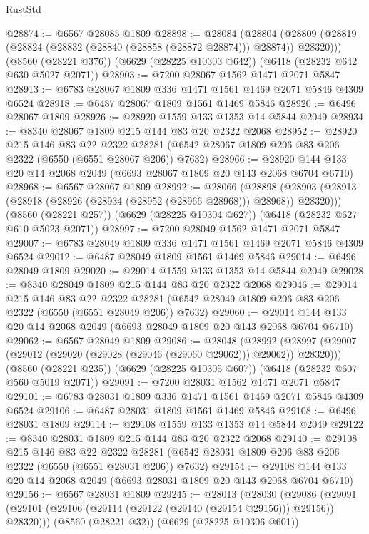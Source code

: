 \begin{lexlean}{RustStd}
\begin{coremodule}
@28874 := @6567 @28085 @1809
@28898 := @28084
    (@28804 (@28809 (@28819 (@28824 (@28832 (@28840 (@28858 (@28872 @28874))) @28874)) @28320)))
    (@8560 (@28221 @376))
    (@6629 (@28225 @10303 @642))
    (@6418 (@28232 @642 @630 @5027 @2071))
@28903 := @7200 @28067 @1562 @1471 @2071 @5847
@28913 := @6783 @28067 @1809 @336 @1471 @1561 @1469 @2071 @5846 @4309 @6524
@28918 := @6487 @28067 @1809 @1561 @1469 @5846
@28920 := @6496 @28067 @1809
@28926 := @28920 @1559 @133 @1353 @14 @5844 @2049
@28934 := @8340 @28067 @1809 @215 @144 @83 @20 @2322 @2068
@28952 := @28920
    @215
    @146
    @83
    @22
    @2322
    @28281
    (@6542 @28067 @1809 @206 @83 @206 @2322 (@6550 (@6551 @28067 @206)) @7632)
@28966 := @28920 @144 @133 @20 @14 @2068 @2049 (@6693 @28067 @1809 @20 @143 @2068 @6704 @6710)
@28968 := @6567 @28067 @1809
@28992 := @28066
    (@28898 (@28903 (@28913 (@28918 (@28926 (@28934 (@28952 (@28966 @28968))) @28968)) @28320)))
    (@8560 (@28221 @257))
    (@6629 (@28225 @10304 @627))
    (@6418 (@28232 @627 @610 @5023 @2071))
@28997 := @7200 @28049 @1562 @1471 @2071 @5847
@29007 := @6783 @28049 @1809 @336 @1471 @1561 @1469 @2071 @5846 @4309 @6524
@29012 := @6487 @28049 @1809 @1561 @1469 @5846
@29014 := @6496 @28049 @1809
@29020 := @29014 @1559 @133 @1353 @14 @5844 @2049
@29028 := @8340 @28049 @1809 @215 @144 @83 @20 @2322 @2068
@29046 := @29014
    @215
    @146
    @83
    @22
    @2322
    @28281
    (@6542 @28049 @1809 @206 @83 @206 @2322 (@6550 (@6551 @28049 @206)) @7632)
@29060 := @29014 @144 @133 @20 @14 @2068 @2049 (@6693 @28049 @1809 @20 @143 @2068 @6704 @6710)
@29062 := @6567 @28049 @1809
@29086 := @28048
    (@28992 (@28997 (@29007 (@29012 (@29020 (@29028 (@29046 (@29060 @29062))) @29062)) @28320)))
    (@8560 (@28221 @235))
    (@6629 (@28225 @10305 @607))
    (@6418 (@28232 @607 @560 @5019 @2071))
@29091 := @7200 @28031 @1562 @1471 @2071 @5847
@29101 := @6783 @28031 @1809 @336 @1471 @1561 @1469 @2071 @5846 @4309 @6524
@29106 := @6487 @28031 @1809 @1561 @1469 @5846
@29108 := @6496 @28031 @1809
@29114 := @29108 @1559 @133 @1353 @14 @5844 @2049
@29122 := @8340 @28031 @1809 @215 @144 @83 @20 @2322 @2068
@29140 := @29108
    @215
    @146
    @83
    @22
    @2322
    @28281
    (@6542 @28031 @1809 @206 @83 @206 @2322 (@6550 (@6551 @28031 @206)) @7632)
@29154 := @29108 @144 @133 @20 @14 @2068 @2049 (@6693 @28031 @1809 @20 @143 @2068 @6704 @6710)
@29156 := @6567 @28031 @1809
@29245 := @28013
    (@28030
      (@29086 (@29091 (@29101 (@29106 (@29114 (@29122 (@29140 (@29154 @29156))) @29156)) @28320)))
      (@8560 (@28221 @32))
      (@6629 (@28225 @10306 @601))

\end{coremodule}
\end{lexlean}
